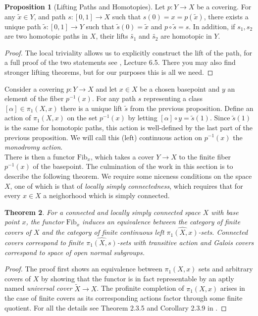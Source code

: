 \documentclass{article}
\newtheorem{theorem}{Theorem}[section]
\theoremstyle{definition}
\newtheorem{proposition}[theorem]{Proposition}
\theoremstyle{remark}
\begin{document}
\begin{proposition}[Lifting Paths and Homotopies]	
	Let $p: Y \to X$ be a covering. 
	For any $\widetilde{x} \in Y$, and path $s: [0,1] \to X$ such that $s(0) = x = p(\widetilde{x})$, there exists a unique path $\widetilde{s}:[0,1] \to Y$ such that $\widetilde{s}(0) = \widetilde{x}$ and $p \circ \widetilde{s} = s$.
	In addition, if $s_1, s_2$ are two homotopic paths in $X$, their lifts $\widetilde{s_1}$ and $\widetilde{s_2}$ are homotopic in $Y$.
\end{proposition}

\begin{proof}
	The local triviality allows us to explicitly construct the lift of the path, for a full proof of the two statements see \cite{FomenkoFuchs}, Lecture 6.5.
	There you may also find stronger lifting theorems, but for our purposes this is all we need.
\end{proof}
		
Consider a covering $p: Y \to X$ and let $x \in X$ be a chosen basepoint and $y$ an element of the fiber $p^{-1}(x)$.
	For any path $s$ representing a class $[\alpha] \in \pi_1(X,x)$ there is a unique lift $\widetilde{s}$ from the previous proposition.
	Define an action of $\pi_1(X,x)$ on the set $p^{-1}(x)$ by letting $[\alpha] \circ y = \widetilde{s}(1)$.
	Since $\widetilde{s}(1)$ is the same for homotopic paths, this action is well-defined by the last part of the previous proposition.
	We will call this (left) continuous action on $p^{-1}(x)$ the \textit{monodromy action}.\\
	\indent There is then a functor $\text{Fib}_x$, which takes a cover $Y \to X$ to the finite fiber $p^{-1}(x)$ of the basepoint.
The culmination of the work in this section is to describe the following theorem.
We require some niceness conditions on the space $X$, one of which is that of \textit{locally simply connectedness}, which requires that for every $x \in X$ a neighorhood which is simply connected.

	\begin{theorem}
	For a connected and locally simply connected space $X$ with base point $x$, the functor $\text{Fib}_x$ induces an equivalence between the category of finite covers of $X$ and the category of finite continuous left $\widehat{\pi_1(X,x)}$-sets.
	Connected covers correspond to finite $\widehat{\pi_1(X,s)}$-sets with transitive action and Galois covers correspond to space of open normal subgroups.
\end{theorem}
\begin{proof}
	The proof first shows an equivalence between $\pi_1(X,x)$ sets and arbitrary covers of $X$ by showing that the functor is in fact representable by an aptly named \textit{universal cover} $\widetilde{X} \to X$.
The profinite completion of $\pi_1(X,x)$ arises in the case of finite covers as its corresponding actions factor through some finite quotient.
	For all the details see Theorem 2.3.5 and Corollary 2.3.9 in \cite{Szamuely}.
\end{proof}
\end{document}
